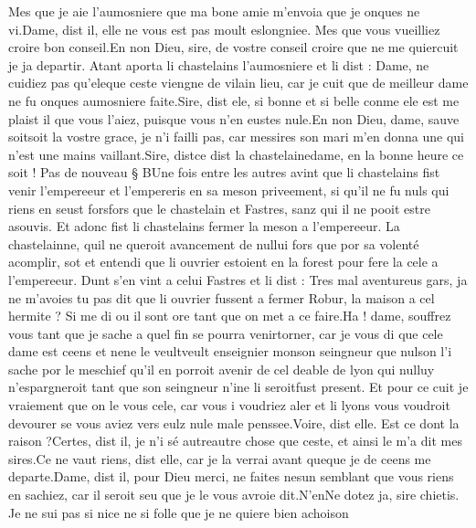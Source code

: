 \documentclass{article}
\begin{document}
\begin{pages}
      Mes que je aie l’aumosniere que ma bone amie m’envoia que je onques ne vi.Dame, dist il, elle ne vous est pas moult eslongniee. Mes que vous vueilliez croire bon conseil.En non Dieu, sire, de vostre conseil croire 
      que ne me quiercuit 
      je ja departir. \pend
\pstart Atant aporta li chastelains l’aumosniere et 
   li dist :
   Dame, ne cuidiez pas qu’eleque ceste 
      viengne de vilain lieu, 
      car je cuit que de meilleur dame ne fu onques aumosniere faite.Sire, dist ele, si bonne et si belle conme ele est me plaist il que vous l’aiez, 
      puisque vous n’en eustes nule.En non Dieu, dame, sauve soitsoit la 
      vostre grace, je n’i failli pas, car messires son mari m’en donna une qui n’est une mains 
      vaillant.Sire, distce dist 
      la chastelainedame, 
      en la bonne heure ce soit ! \pend
\pstart Pas de nouveau § BUne fois entre les autres avint que li chastelains fist venir 
   l’empereeur et l’empereris 
   en sa meson priveement, si qu’il ne fu nuls qui riens en seust 
   forsfors que 
   le chastelain et Fastres, sanz qui il ne pooit estre asouvis. 
   Et adonc fist li chastelains fermer la meson a l’empereeur. 
   La chastelainne, quil ne queroit avancement de nullui fors que por sa volenté acomplir, 
   sot et entendi que li ouvrier estoient en la forest pour fere 
   la cele a 
   l’empereeur. Dunt s’en vint a celui Fastres et li dist :
   Tres mal aventureus gars, ja ne m’avoies tu pas dit que li ouvrier fussent a fermer 
   Robur, la maison a cel hermite ? 
      Si me di ou il sont ore tant que on met a ce faire.Ha ! dame, souffrez vous tant que je sache a quel fin se pourra 
      venirtorner, 
   car je vous di que cele dame est ceens et 
      nene le 
      veultveult enseignier 
      monson seingneur 
      que nulson l'i sache por le meschief qu’il 
      en porroit avenir de 
      cel deable de lyon qui nulluy n’espargneroit tant que 
      son seingneur n’ine li 
      seroitfust present. 
      Et pour ce cuit je vraiement que on le vous cele, car vous i 
      voudriez aler et li lyons 
   vous voudroit devourer se vous aviez vers eulz nule male penssee.Voire, dist elle. Est ce dont la raison ?Certes, dist il, je n’i sé autreautre chose 
      que ceste, et ainsi le m’a dit mes sires.Ce ne vaut riens, dist elle, car je la verrai avant 
      queque je de ceens me departe.Dame, dist il, pour Dieu merci, ne faites nesun semblant que vous riens en sachiez, 
      car il seroit seu que je le vous avroie dit.N’enNe dotez ja, 
      sire chietis. 
      Je ne sui pas si nice ne si folle que je ne quiere bien achoison 

\end{pages}
\end{document}
